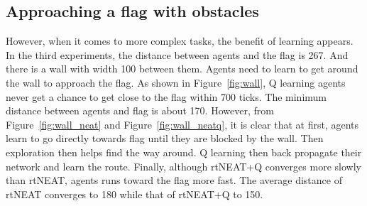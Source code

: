 \documentclass[letterpaper]{article}
\begin{document}
\subsection{Approaching a flag with obstacles}
However, when it comes to more complex tasks, the benefit of learning appears. In the third experiments, the distance between agents and the flag is 267. And there is a wall with width 100 between them. Agents need to learn to get around the wall to approach the flag. As shown in Figure~\ref{fig:wall}, Q learning agents never get a chance to get close to the flag within 700 ticks. The minimum distance between agents and flag is about 170. However, from Figure~\ref{fig:wall_neat} and Figure~\ref{fig:wall_neatq}, it is clear that at first, agents learn to go directly towards flag until they are blocked by the wall. Then exploration then helps find the way around. Q learning then back propagate their network and learn the route. Finally, although rtNEAT+Q converges more slowly than rtNEAT, agents runs toward the flag more fast. The average distance of rtNEAT converges to 180 while that of rtNEAT+Q to 150. 
\end{document}
